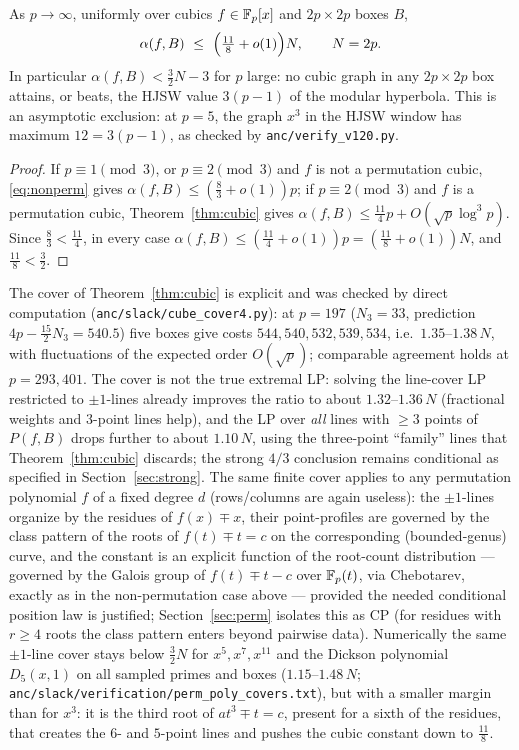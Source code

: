 \begin{corollary}\label{cor:cubic}
As $p\to\infty$, uniformly over cubics $f\in\mathbb{F}_p[x]$ and $2p\times2p$ boxes $B$,
\[
\alpha(f,B)\ \le\ \Bigl(\tfrac{11}8+o(1)\Bigr)N,\qquad N=2p.
\]
In particular $\alpha(f,B)<\tfrac32N-3$ for $p$ large: no cubic graph in any $2p\times2p$ box attains, or beats, the
HJSW value $3(p-1)$ of the modular hyperbola.  This is an asymptotic exclusion: at $p=5$, the graph $x^3$ in the HJSW window has maximum $12=3(p-1)$, as checked by \texttt{anc/verify\_v120.py}.
\end{corollary}
\begin{proof}
If $p\equiv1\pmod3$, or $p\equiv2\pmod3$ and $f$ is not a permutation cubic, \eqref{eq:nonperm} gives
$\alpha(f,B)\le(\tfrac83+o(1))p$; if $p\equiv2\pmod3$ and $f$ is a permutation cubic, Theorem~\ref{thm:cubic} gives
$\alpha(f,B)\le\tfrac{11}4p+O(\sqrt p\log^3p)$. Since $\tfrac83<\tfrac{11}4$, in every case
$\alpha(f,B)\le(\tfrac{11}4+o(1))p=(\tfrac{11}8+o(1))N$, and $\tfrac{11}8<\tfrac32$.
\end{proof}

\begin{remark}
The cover of Theorem~\ref{thm:cubic} is explicit and was checked by direct computation
(\texttt{anc/slack/cube\_cover4.py}): at $p=197$ ($N_3=33$, prediction $4p-\tfrac{15}2N_3=540.5$) five boxes give costs
$544,540,532,539,534$, i.e.\ $1.35$--$1.38\,N$, with fluctuations of the expected order $O(\sqrt p)$; comparable
agreement holds at $p=293,401$. The cover is not the true extremal LP: solving the line-cover LP restricted to
$\pm1$-lines already improves the ratio to about $1.32$--$1.36\,N$ (fractional weights and $3$-point lines help),
and the LP over \emph{all} lines with $\ge3$ points of $P(f,B)$ drops further to about $1.10\,N$, using the
three-point ``family'' lines that Theorem~\ref{thm:cubic} discards; the strong $4/3$ conclusion remains conditional as specified in Section~\ref{sec:strong}. The same finite cover applies to any permutation polynomial $f$ of a fixed degree $d$ (rows/columns are
again useless): the $\pm1$-lines organize by the residues of $f(x)\mp x$, their point-profiles are governed by the
class pattern of the roots of $f(t)\mp t=c$ on the corresponding (bounded-genus) curve, and the constant is an
explicit function of the root-count distribution — governed by the Galois group of $f(t)\mp t-c$ over $\mathbb{F}_p(t)$, via
Chebotarev, exactly as in the non-permutation case above — provided the needed conditional position law is justified; Section~\ref{sec:perm} isolates this as CP (for residues with $r\ge4$ roots the class pattern enters beyond
pairwise data). Numerically the same $\pm1$-line cover stays below $\tfrac32N$ for $x^5,x^7,x^{11}$ and the Dickson
polynomial $D_5(x,1)$ on all sampled primes and boxes ($1.15$--$1.48\,N$; \texttt{anc/slack/verification/perm\_poly\_covers.txt}),
but with a smaller margin than for $x^3$: it is the third root of $at^3\mp t=c$, present for a sixth of the residues, that
creates the $6$- and $5$-point lines and pushes the cubic constant down to $\tfrac{11}8$.
\end{remark}
